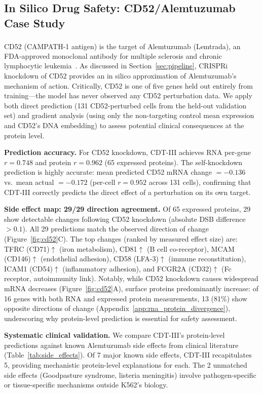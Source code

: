 \documentclass{article}
\begin{document}
\subsection{In Silico Drug Safety: CD52/Alemtuzumab Case Study}
\label{sec:cd52}
\vspace{-2mm}
CD52 (CAMPATH-1 antigen) is the target of Alemtuzumab (Lemtrada\textsuperscript{\textregistered}), an FDA-approved monoclonal antibody for multiple sclerosis and chronic lymphocytic leukemia~\citep{ruck2022}. As discussed in Section~\ref{sec:pipeline}, CRISPRi knockdown of CD52 provides an in silico approximation of Alemtuzumab's mechanism of action. Critically, CD52 is one of five genes held out entirely from training---the model has never observed any CD52 perturbation data. We apply both direct prediction (131 CD52-perturbed cells from the held-out validation set) and gradient analysis (using only the non-targeting control mean expression and CD52's DNA embedding) to assess potential clinical consequences at the protein level.

\textbf{Prediction accuracy.} For CD52 knockdown, CDT-III achieves RNA per-gene $r = 0.748$ and protein $r = 0.962$ (65 expressed proteins). The self-knockdown prediction is highly accurate: mean predicted CD52 mRNA change $= -0.136$ vs.\ mean actual $= -0.172$ (per-cell $r = 0.952$ across 131 cells), confirming that CDT-III correctly predicts the direct effect of a perturbation on its own target.

\textbf{Side effect map: 29/29 direction agreement.} Of 65 expressed proteins, 29 show detectable changes following CD52 knockdown (absolute DSB difference $> 0.1$). All 29 predictions match the observed direction of change (Figure~\ref{fig:cd52}C). The top changes (ranked by measured effect size) are: TFRC (CD71)$\uparrow$ (iron metabolism), CD81$\uparrow$ (B cell co-receptor), MCAM (CD146)$\uparrow$ (endothelial adhesion), CD58 (LFA-3)$\uparrow$ (immune reconstitution), ICAM1 (CD54)$\uparrow$ (inflammatory adhesion), and FCGR2A (CD32)$\uparrow$ (Fc receptor, autoimmunity link). Notably, while CD52 knockdown causes widespread mRNA decreases (Figure~\ref{fig:cd52}A), surface proteins predominantly increase: of 16 genes with both RNA and expressed protein measurements, 13 (81\%) show opposite directions of change (Appendix~\ref{app:rna_protein_divergence}), underscoring why protein-level prediction is essential for safety assessment.

\textbf{Systematic clinical validation.} We compare CDT-III's protein-level predictions against known Alemtuzumab side effects from clinical literature~\citep{ruck2022,thompson2010,devonshire2018} (Table~\ref{tab:side_effects}). Of 7 major known side effects, CDT-III recapitulates 5, providing mechanistic protein-level explanations for each. The 2 unmatched side effects (Goodpasture syndrome, listeria meningitis) involve pathogen-specific or tissue-specific mechanisms outside K562's biology.
\end{document}

